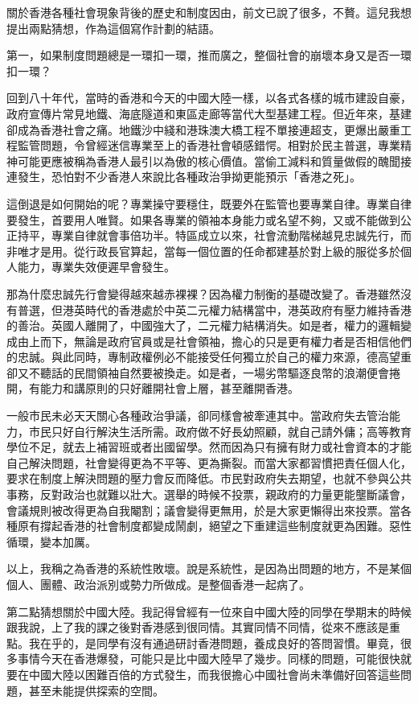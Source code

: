 關於香港各種社會現象背後的歷史和制度因由，前文已說了很多，不贅。這兒我想提出兩點猜想，作為這個寫作計劃的結語。

第一，如果制度問題總是一環扣一環，推而廣之，整個社會的崩壞本身又是否一環扣一環？

回到八十年代，當時的香港和今天的中國大陸一樣，以各式各樣的城市建設自豪，政府宣傳片常見地鐵、海底隧道和東區走廊等當代大型基建工程。但近年來，基建卻成為香港社會之痛。地鐵沙中綫和港珠澳大橋工程不單接連超支，更爆出嚴重工程監管問題，令曾經迷信專業至上的香港社會頓感錯愕。相對於民主普選，專業精神可能更應被稱為香港人最引以為傲的核心價值。當偷工減料和質量做假的醜聞接連發生，恐怕對不少香港人來說比各種政治爭拗更能預示「香港之死」。

這倒退是如何開始的呢？專業操守要穩住，既要外在監管也要專業自律。專業自律要發生，首要用人唯賢。如果各專業的領袖本身能力或名望不夠，又或不能做到公正持平，專業自律就會事倍功半。特區成立以來，社會流動階梯越見忠誠先行，而非唯才是用。從行政長官算起，當每一個位置的任命都建基於對上級的服從多於個人能力，專業失效便遲早會發生。

那為什麼忠誠先行會變得越來越赤裸裸？因為權力制衡的基礎改變了。香港雖然沒有普選，但港英時代的香港處於中英二元權力結構當中，港英政府有壓力維持香港的善治。英國人離開了，中國強大了，二元權力結構消失。如是者，權力的邏輯變成由上而下，無論是政府官員或是社會領袖，擔心的只是更有權力者是否相信他們的忠誠。與此同時，專制政權例必不能接受任何獨立於自己的權力來源，德高望重卻又不聽話的民間領袖自然要被換走。如是者，一場劣幣驅逐良幣的浪潮便會捲開，有能力和講原則的只好離開社會上層，甚至離開香港。

一般市民未必天天關心各種政治爭議，卻同樣會被牽連其中。當政府失去管治能力，市民只好自行解決生活所需。政府做不好長幼照顧，就自己請外傭；高等教育學位不足，就去上補習班或者出國留學。然而因為只有擁有財力或社會資本的才能自己解決問題，社會變得更為不平等、更為撕裂。而當大家都習慣把責任個人化，要求在制度上解決問題的壓力會反而降低。市民對政府失去期望，也就不參與公共事務，反對政治也就難以壯大。選舉的時候不投票，親政府的力量更能壟斷議會，會議規則被改得更為自我閹割；議會變得更無用，於是大家更懶得出來投票。當各種原有撐起香港的社會制度都變成鬧劇，絕望之下重建這些制度就更為困難。惡性循環，變本加厲。

以上，我稱之為香港的系統性敗壞。說是系統性，是因為出問題的地方，不是某個個人、團體、政治派別或勢力所做成。是整個香港一起病了。

第二點猜想關於中國大陸。我記得曾經有一位來自中國大陸的同學在學期末的時候跟我說，上了我的課之後對香港感到很同情。其實同情不同情，從來不應該是重點。我在乎的，是同學有沒有通過研討香港問題，養成良好的答問習慣。畢竟，很多事情今天在香港爆發，可能只是比中國大陸早了幾步。同樣的問題，可能很快就要在中國大陸以困難百倍的方式發生，而我很擔心中國社會尚未準備好回答這些問題，甚至未能提供探索的空間。


